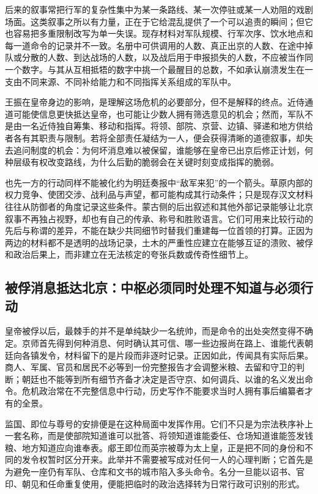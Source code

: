 后来的叙事常把行军的复杂性集中为某一条路线、某一次停驻或某一人劝阻的戏剧场面。这类叙事之所以有力量，正在于它给混乱提供了一个可以追责的瞬间；但它也容易把多重限制改写为单一失误。现存材料对军队规模、行军次序、饮水地点和每一道命令的记录并不一致。名册中可供调用的人数、真正出京的人数、在途中掉队或分散的人数、到达战场的人数，以及战后用于申报损失的人数，不应被当作同一个数字。与其从互相抵牾的数字中挑一个最醒目的总数，不如承认崩溃发生在一支由不同来源、不同补给能力和不同指挥关系组成的军队中。

王振在皇帝身边的影响，是理解这场危机的必要部分，但不是解释的终点。近侍通道可能使信息更快抵达皇帝，也可能让少数人拥有筛选意见的机会；然而，军队不是由一名近侍独自筹集、移动和指挥。将领、部院、京营、边镇、驿递和地方供给者各有其职责与限制。若将全部责任凝结为一人，便会获得清晰的道德叙事，却失去追问制度的机会：为何坏消息难以被保留，谁能够在皇帝已出京后修正计划，何种层级有权改变路线，为什么后勤的脆弱会在关键时刻变成指挥的脆弱。

也先一方的行动同样不能被化约为明廷奏报中“敌军来犯”的一个箭头。草原内部的权力竞争、使团交涉、战利品与声望，都可能构成其行动条件；只是现存汉文材料往往从防御者的角度记录这些条件。蒙古侧的后出叙述和其他外部记录能够让北京叙事不再独占视野，却也有自己的传承、称号和胜败语言。它们可用来比较行动的先后与称谓的差异，不能在缺少共同细节时替我们重建每一位首领的打算。正因为两边的材料都不是透明的战场记录，土木的严重性应建立在能够互证的溃败、被俘和政治后果上，而非建立在无法核定的夸张兵数或传奇性细节上。

\subsection{被俘消息抵达北京：中枢必须同时处理不知道与必须行动}

皇帝被俘以后，最棘手的并不是单纯缺少一名统帅，而是命令的出处突然变得不确定。京师首先得到何种消息、何时确认其可信、哪一些边报尚在路上、谁能代表朝廷向各镇发令，材料留下的是片段而非逐时记录。正因如此，传闻具有实际后果。商人、军属、官员和居民不必等到一份完整报告才会调整米粮、去留和守卫的判断；朝廷也不能等到所有细节齐备才决定是否守京、如何调兵、以谁的名义发出命令。危机政治常在不完整信息中行动，历史写作不能要求当时人拥有事后编纂者才有的全景。

监国、即位与尊号的安排便是在这种局面中发挥作用。它们不只是为宗法秩序补上一套名称，而是使部院知道谁可以批答、将领知道谁能委任、仓场知道谁能签发钱粮、地方知道应向谁奉表。郕王即位而英宗被尊为太上皇，正是把不同的身份和不同的发令权暂时区分开来。此举并不需要被写成对任何一人的心理判断；它首先是为避免一座仍有军队、仓库和文书的城市陷入多头命令。名分一旦能以诏书、官印、朝见和任命重复使用，便能把临时的政治选择转为日常行政可识别的形式。

